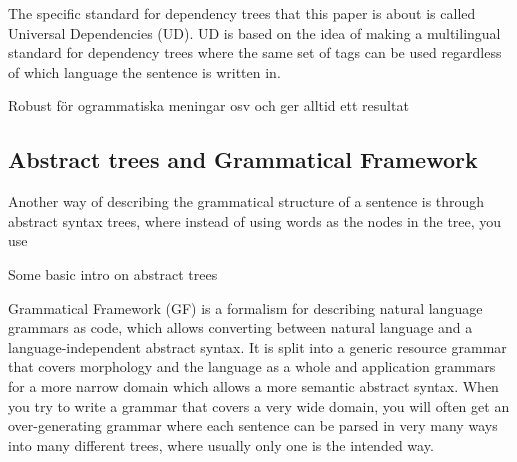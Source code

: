\documentclass{article}
\begin{document}
The specific standard for dependency trees that this paper is about is called Universal Dependencies (UD). UD is based on the idea of making a multilingual standard for dependency trees where the same set of tags can be used regardless of which language the sentence is written in.


Robust för ogrammatiska meningar osv och ger alltid ett resultat






\subsection{Abstract trees and Grammatical Framework}

Another way of describing the grammatical structure of a sentence is through abstract syntax trees, where instead of using words as the nodes in the tree, you use

Some basic intro on abstract trees
 

Grammatical Framework\cite{ranta-2004} (GF) is a formalism for describing natural language grammars as code, which allows converting between natural language and a language-independent abstract syntax. It is split into a generic resource grammar that covers morphology and the language as a whole and application grammars for a more narrow domain which allows a more semantic abstract syntax. When you try to write a grammar that covers a very wide domain, you will often get an over-generating grammar where each sentence can be parsed in very many ways into many different trees, where usually only one is the intended way.
\end{document}
